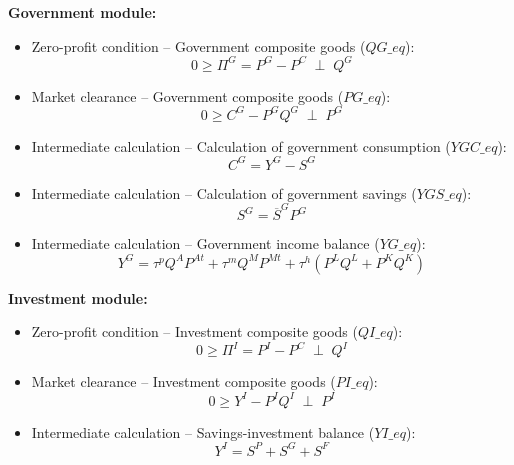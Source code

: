 \documentclass[12pt, a4paper]{article}
\numberwithin{equation}{section}
\numberwithin{figure}{section}
\numberwithin{table}{section}
\begin{document}
\textbf{Government module:}
\begin{itemize}
	\item Zero-profit condition -- Government composite goods (\(QG\_eq\)): 
	\begin{equation}
		0\geq\Pi^G = P^G - P^C \;\perp\; Q^G
	\end{equation}
	\item Market clearance -- Government composite goods (\(PG\_eq\)): 
	\begin{equation}
		0\geq C^G - P^{G}Q^{G} \;\perp\; P^G
	\end{equation}
	\item Intermediate calculation -- Calculation of government consumption (\(YGC\_eq\)): 
	\begin{equation}
		C^G = Y^G - S^G
	\end{equation}
	\item Intermediate calculation -- Calculation of government savings (\(YGS\_eq\)): 
	\begin{equation}
		S^G = \overline{S}^{G}P^{G}
	\end{equation}
	\item Intermediate calculation -- Government income balance (\(YG\_eq\)): 
	\begin{equation}
		Y^G = \tau^{p}Q^{A}P^{At} + \tau^{m}Q^{M}P^{Mt} + \tau^{h}\left(P^{L}Q^{L} + P^{K}Q^{K}\right)
	\end{equation}
\end{itemize}

\textbf{Investment module:}
\begin{itemize}
	\item Zero-profit condition -- Investment composite goods (\(QI\_eq\)): 
	\begin{equation}
		0\geq\Pi^I = P^I - P^C \;\perp\; Q^I
	\end{equation}
	\item Market clearance -- Investment composite goods (\(PI\_eq\)): 
	\begin{equation}
		0\geq Y^I - P^{I}Q^{I} \;\perp\; P^I
	\end{equation}
	\item Intermediate calculation -- Savings-investment balance (\(YI\_eq\)): 
	\begin{equation}
		Y^I = S^P+S^G+S^F
	\end{equation}
\end{itemize}
\end{document}
